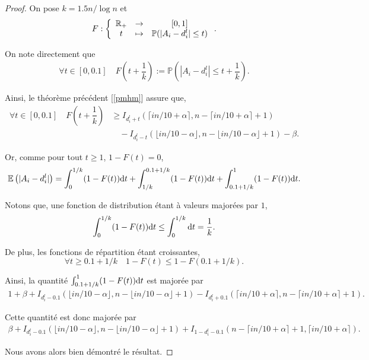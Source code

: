 \begin{proof}
    On pose \( k = 1.5n/\log n\) et  
    \[
        F : \left\{
            \begin{array}[]{ccc}
                \R_+ & \to & [0,1]\\
                t & \mapsto & \mathbb P(|A_i - d_i^l| \leq t)
            \end{array}
        \right.   .
    \]

    On note directement que 
    \begin{align*}
        \forall t \in [0, 0.1] \quad F\left( t + \dfrac{1}{k} \right) := \mathbb P\left(|A_i - d_i^l| \leq t + \dfrac{1}{k}\right).
    \end{align*}

    Ainsi, le théorème précédent [\ref{pmhm}] assure que,
    \begin{align*}
        \forall t \in [0, 0.1] \quad F\left( t + \dfrac{1}{k} \right) & \geq  I_{d_i^l + t}(\lceil in/10 + \alpha\rceil, n - \lceil in/10 + \alpha \rceil + 1)\\
        & \quad - I_{d_i^l - t}(\lfloor in/10 - \alpha \rfloor , n - \lfloor in/10 - \alpha \rfloor + 1) - \beta .
    \end{align*}

    Or, comme pour tout \(t \geq 1\), \(1 - F(t) = 0\),
    \[
        \mathbb E\left( |A_i - d_i^l| \right) = \int_{0}^{1/k} (1 - F(t))\mathrm{d} t + \int_{1/k}^{0.1 + 1/k} (1 - F(t))\mathrm{d} t + \int_{0.1 + 1/k}^{1} (1 - F(t))\mathrm{d} t .
    \]

    Notons que, une fonction de distribution étant à valeurs majorées par \(1\), 
    \[
        \int_0^{1/k} (1 - F(t))\mathrm{d} t \leq \int_0^{1/k}\mathrm{d} t = \dfrac{1}{k}.
    \]

    De plus, les fonctions de répartition étant croissantes,
    \[
        \forall t \geq 0.1 + 1/k \quad 1 - F(t) \leq 1 - F(0.1 + 1/k).
    \]

    Ainsi, la quantité \( \int_{0.1 + 1/k}^{1} (1 - F(t))\mathrm{d} t\) est majorée par 
    \begin{align*}
        1 + \beta + I_{d_i^l - 0.1}(\lfloor in/10 - \alpha \rfloor , n - \lfloor in/10 - \alpha \rfloor + 1) -  I_{d_i^l + 0.1}(\lceil in/10 + \alpha\rceil, n - \lceil in/10 + \alpha \rceil + 1).
    \end{align*}

    Cette quantité est donc majorée par 
    \begin{align*}
        \beta + I_{d_i^l - 0.1}(\lfloor in/10 - \alpha \rfloor , n - \lfloor in/10 - \alpha \rfloor + 1) + I_{1 - d_i^l - 0.1}(n - \lceil in/10 + \alpha \rceil + 1, \lceil in/10 + \alpha\rceil).
    \end{align*}


    Nous avons alors bien démontré le résultat.
\end{proof}

